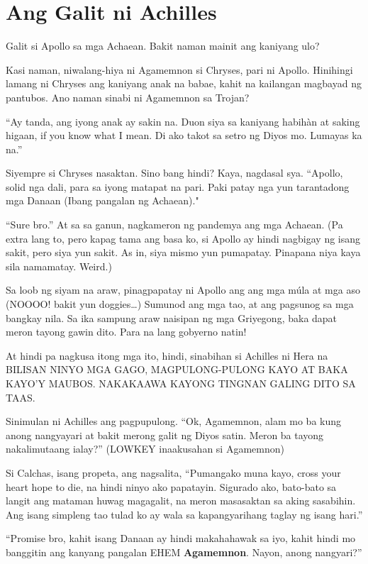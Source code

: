 \documentclass[12pt,letterpaper]{report}
\begin{document}
\chapter{Ang Galit ni Achilles}

Galit si Apollo sa mga Achaean. Bakit naman mainit ang kaniyang ulo?


Kasi naman, niwalang-hiya ni Agamemnon si Chryses, pari ni Apollo. Hinihingi lamang ni Chryses ang kaniyang anak na babae, kahit na kailangan magbayad ng pantubos. Ano naman sinabi ni Agamemnon sa Trojan?

``Ay tanda, ang iyong anak ay sakin na. Duon siya sa kaniyang habih\`{a}n at saking higaan, if you know what I mean. Di ako takot sa setro ng Diyos mo. Lumayas ka na.''

Siyempre si Chryses nasaktan. Sino bang hindi? Kaya, nagdasal sya. ``Apollo, solid nga dali, para sa iyong matapat na pari. Paki patay nga yun tarantadong mga Danaan (Ibang pangalan ng Achaean)."

``Sure bro.'' At sa sa ganun, nagkameron ng pandemya ang mga Achaean. (Pa extra lang to, pero kapag tama ang basa ko, si Apollo ay hindi nagbigay ng isang sakit, pero siya yun sakit. As in, siya mismo yun pumapatay. Pinapana niya kaya sila namamatay. Weird.) 

Sa loob ng siyam na araw, pinagpapatay ni Apollo ang ang mga m\'{u}la at mga aso (NOOOO! bakit yun doggies\dots) Sumunod ang mga tao, at ang pagsunog sa mga bangkay nila. Sa ika sampung araw naisipan ng mga Griyegong, baka dapat meron tayong gawin dito. Para na lang gobyerno natin!

At hindi pa nagkusa itong mga ito, hindi, sinabihan si Achilles ni Hera na BILISAN NINYO MGA GAGO, MAGPULONG-PULONG KAYO AT BAKA KAYO'Y MAUBOS. NAKAKAAWA KAYONG TINGNAN GALING DITO SA TAAS.

Sinimulan ni Achilles ang pagpupulong. ``Ok, Agamemnon, alam mo ba kung anong nangyayari at bakit merong galit ng Diyos satin. Meron ba tayong nakalimutaang ialay?'' (LOWKEY inaakusahan si Agamemnon)

Si Calchas, isang propeta, ang nagsalita, ``Pumangako muna kayo, cross your heart hope to die, na hindi ninyo ako papatayin. Sigurado ako, bato-bato sa langit ang mataman huwag magagalit, na meron masasaktan sa aking sasabihin. Ang isang simpleng tao tulad ko ay wala sa kapangyarihang taglay ng isang hari.''

``Promise bro, kahit isang Danaan ay hindi makahahawak sa iyo, kahit hindi mo banggitin ang kanyang pangalan EHEM \textbf{Agamemnon}. Nayon, anong nangyari?''
\end{document}
